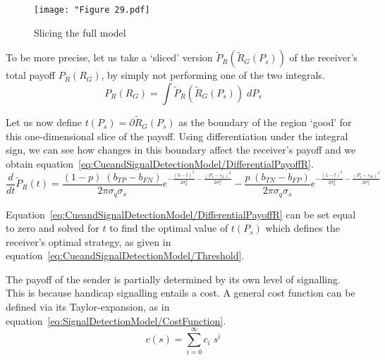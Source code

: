 \documentclass[a4paper,12pt]{article}
\numberwithin{equation}{section}
\begin{document}
\begin{figure}[!h]
\begin{center}
\leavevmode
\texttt{[image: "Figure 29.pdf]}
\caption{Slicing the full model}
\label{fig:Figure 29.pdf}
\end{center}
\end{figure}

To be more precise, let us take a `sliced' version $\tilde{P}_{R}(\tilde{R}_{G}(P_{s}))$ of the receiver's total payoff $P_{R}(R_{G})$, by simply not performing one of the two integrals.
\begin{equation}
\label{eq:CueandSignalDetectionModel/SlicedPayoffR}
P_{R}(R_{G}) = \displaystyle \int \tilde{P}_{R}(\tilde{R}_{G}(P_{s})) \; dP_{s}
\end{equation}

Let us now define $t(P_{s})=\partial \tilde{R}_{G}(P_{s})$ as the boundary of the region `good' for this \mbox{one-dimensional} slice of the payoff. Using differentiation under the integral sign, we can see how changes in this boundary affect the receiver's payoff and we obtain equation~\ref{eq:CueandSignalDetectionModel/DifferentialPayoffR}.
\begin{equation}
\label{eq:CueandSignalDetectionModel/DifferentialPayoffR}
\frac{d}{dt}\tilde{P}_{R}(t)= \frac{(1-p) \; (b_{TP}-b_{FN})}{2 \pi \sigma_{q} \sigma_{s}} e^{-\frac{(0-t)^2}{2 \sigma_{q}^2}-\frac{(P_{s}-s_{L})^2}{2 \sigma_{s}^2}} - \frac{p \; (b_{TN}-b_{FP})}{2 \pi \sigma_{q} \sigma_{s}} e^{-\frac{(1-t)^2}{2 \sigma_{q}^2}-\frac{(P_{s}-s_{H})^2}{2 \sigma_{s}^2}}
\end{equation}

Equation~\ref{eq:CueandSignalDetectionModel/DifferentialPayoffR} can be set equal to zero and solved for $t$ to find the optimal value of $t(P_{s})$ which defines the receiver's optimal strategy, as given in equation~\ref{eq:CueandSignalDetectionModel/Threshold}.

The payoff of the sender is partially determined by its own level of signalling. This is because handicap signalling entails a cost. A general cost function can be defined via its Taylor-expansion, as in equation~\ref{eq:SignalDetectionModel/CostFunction}.
\begin{equation}
\label{eq:SignalDetectionModel/CostFunction}
c(s)=\sum_{i=0}^{\infty} c_{i} \; s^{i}
\end{equation}
\end{document}
